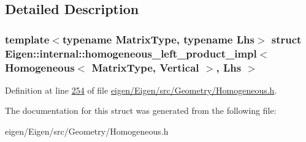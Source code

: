 \subsection{Detailed Description}
\subsubsection*{template$<$typename Matrix\+Type, typename Lhs$>$\newline
struct Eigen\+::internal\+::homogeneous\+\_\+left\+\_\+product\+\_\+impl$<$ Homogeneous$<$ Matrix\+Type, Vertical $>$, Lhs $>$}



Definition at line \hyperlink{eigen_2_eigen_2src_2_geometry_2_homogeneous_8h_source_l00254}{254} of file \hyperlink{eigen_2_eigen_2src_2_geometry_2_homogeneous_8h_source}{eigen/\+Eigen/src/\+Geometry/\+Homogeneous.\+h}.



The documentation for this struct was generated from the following file\+:\begin{DoxyCompactItemize}
\item 
eigen/\+Eigen/src/\+Geometry/\+Homogeneous.\+h\end{DoxyCompactItemize}
